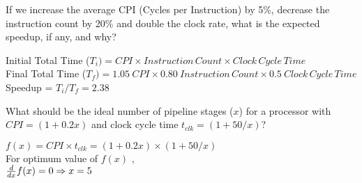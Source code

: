 \begin{ExerciseList}
\Exercise
If we increase the average CPI (Cycles per Instruction) by 5\%, decrease the instruction count by 20\% and
double the clock rate, what is the expected speedup, if any, and why?

\Answer
Initial Total Time ($T_i) = CPI \times Instruction\,Count \times Clock\, Cycle\, Time $\\
Final Total Time ($T_f) = 1.05\:CPI \times 0.80\: Instruction\,Count \times 0.5\:Clock\, Cycle\, Time $\\
Speedup = $T_i / T_f = 2.38$


\Exercise
What should be the ideal number of pipeline stages ($x$) for a processor with
$CPI = (1+0.2x)$ and clock cycle time $t_{clk} = (1+50/x)$?

\Answer
$f(x) = CPI \times t_{clk} = (1+0.2x)\times(1+50/x) $\\
For optimum value of $f(x)$ , \\
$\frac{d}{dx}f(x) = 0\\
\Rightarrow x = 5$


\end{ExerciseList}
